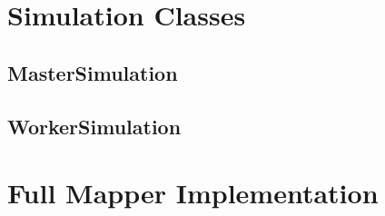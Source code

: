 \documentclass[12pt]{report}
\begin{document}
\tableofcontents

\renewcommand{\chaptername}{}













\clearpage




\begin{appendices}

\chapter{Simulation Classes}
\section{MasterSimulation}

\clearpage

\clearpage
\section{WorkerSimulation}

\clearpage

\clearpage
\chapter{Full Mapper Implementation}

\clearpage

\clearpage

\end{appendices}
\end{document}
